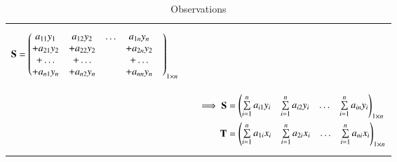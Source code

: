 \documentclass[journal,12pt]{IEEEtran}
\begin{document}
\begin{longtable}{|l|l|}
{\begin{align}
    \mathbf{S}&=\begin{pmatrix}a_{11}y_1&a_{12}y_2&\dots &a_{1n}y_n\\+a_{21}y_2&+a_{22}y_2&\quad&+a_{2n}y_2\\+\dots&+\dots&\quad&+\dots\\+a_{n1}y_n&+a_{n2}y_n&\quad&+a_{nn}y_n&\end{pmatrix}_{1\times n}
    \end{align}}\\&\parbox{13cm}{\begin{align}
    \implies\mathbf{S}&=\begin{pmatrix}\sum\limits_{i=1}^na_{i1}y_i&\sum\limits_{i=1}^na_{i2}y_i&\dots&\sum\limits_{i=1}^na_{in}y_i\end{pmatrix}_{1\times n}\label{Ssol}\\
    \mathbf{T}&=\begin{pmatrix}\sum\limits_{i=1}^na_{1i}x_i&\sum\limits_{i=1}^na_{2i}x_i&\dots&\sum\limits_{i=1}^na_{ni}x_i\end{pmatrix}_{1\times n}\label{Tsol}
\end{align}}\\
\hline
\caption{Observations}
\label{obs}
\end{longtable}
\renewcommand{\thetable}{3}
\end{document}
